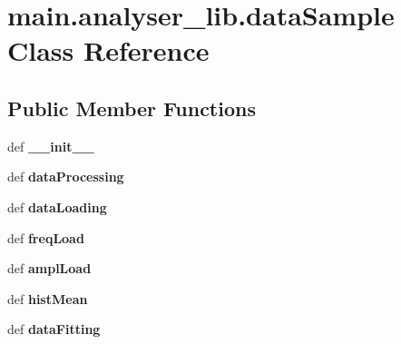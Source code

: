 \hypertarget{classmain_1_1analyser__lib_1_1data_sample}{\section{main.\-analyser\-\_\-lib.\-data\-Sample Class Reference}
\label{classmain_1_1analyser__lib_1_1data_sample}
}
\subsection*{Public Member Functions}
\begin{DoxyCompactItemize}
\item 
\hypertarget{classmain_1_1analyser__lib_1_1data_sample_a91377525aad7ec9327a94f75694c07ad}{def {\bfseries \-\_\-\-\_\-init\-\_\-\-\_\-}}\label{classmain_1_1analyser__lib_1_1data_sample_a91377525aad7ec9327a94f75694c07ad}

\item 
\hypertarget{classmain_1_1analyser__lib_1_1data_sample_a485be95431a894430bef2d96ee4bea31}{def {\bfseries data\-Processing}}\label{classmain_1_1analyser__lib_1_1data_sample_a485be95431a894430bef2d96ee4bea31}

\item 
\hypertarget{classmain_1_1analyser__lib_1_1data_sample_aa7a0ccbd0a41d43509bf041863c85c6b}{def {\bfseries data\-Loading}}\label{classmain_1_1analyser__lib_1_1data_sample_aa7a0ccbd0a41d43509bf041863c85c6b}

\item 
\hypertarget{classmain_1_1analyser__lib_1_1data_sample_a98c56cf51a83419680f660f5e18e57e7}{def {\bfseries freq\-Load}}\label{classmain_1_1analyser__lib_1_1data_sample_a98c56cf51a83419680f660f5e18e57e7}

\item 
\hypertarget{classmain_1_1analyser__lib_1_1data_sample_a97c95d808e36679f67a6dd317ef947f1}{def {\bfseries ampl\-Load}}\label{classmain_1_1analyser__lib_1_1data_sample_a97c95d808e36679f67a6dd317ef947f1}

\item 
\hypertarget{classmain_1_1analyser__lib_1_1data_sample_a8948dcb697cf51f18252acd12ae62a7a}{def {\bfseries hist\-Mean}}\label{classmain_1_1analyser__lib_1_1data_sample_a8948dcb697cf51f18252acd12ae62a7a}

\item 
\hypertarget{classmain_1_1analyser__lib_1_1data_sample_a3f045514e377012cdad423bc151dd59b}{def {\bfseries data\-Fitting}}\label{classmain_1_1analyser__lib_1_1data_sample_a3f045514e377012cdad423bc151dd59b}


\end{DoxyCompactItemize}
